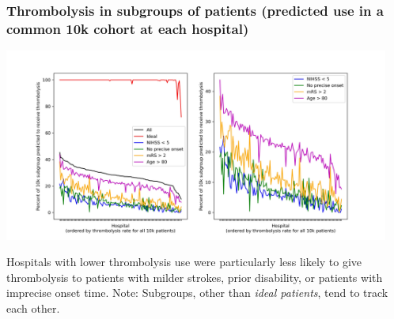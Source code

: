 \begin{frame}
\frametitle{Thrombolysis in subgroups of patients (predicted use in a common 10k cohort at each hospital)}

    \begin{center}
    \includegraphics[width=0.95\textwidth]{./images/15_10k_subgroup.jpg}
    \end{center}

\footnotesize Hospitals with lower thrombolysis use were particularly less likely to give thrombolysis to patients with milder strokes, prior disability, or patients with imprecise onset time.
\newline
\newline
\footnotesize Note: Subgroups, other than \emph{ideal patients}, tend to track each other.  

\end{frame}
